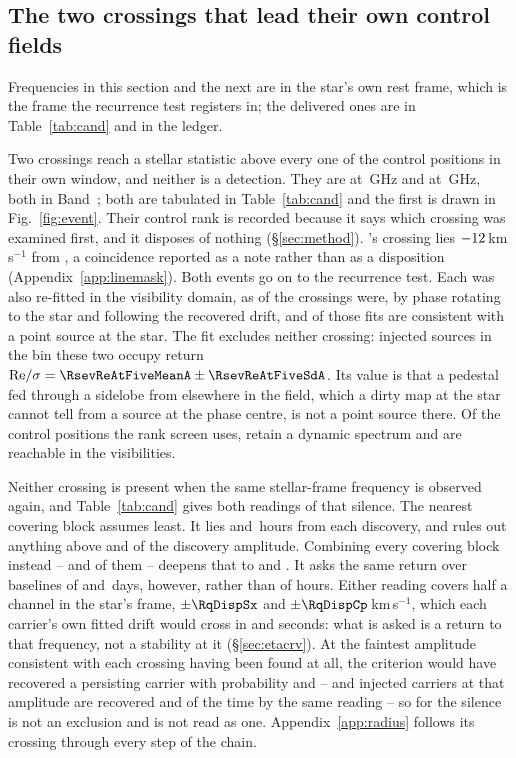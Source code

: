 \subsection{The two crossings that lead their own control fields}
\label{sec:vistest}

Frequencies in this section and the next are in the star's own rest frame,
which is the frame the recurrence test registers in; the delivered ones are in
Table~\ref{tab:cand} and in the ledger.

Two crossings reach a stellar statistic above every one of the \NCtrl{}
control positions in their own window, and neither is a detection. They are
\EvAStar{} at \RqFreqSx\,GHz and \EvBStar{} at \RqFreqCp\,GHz, both in
Band~\EvABand; both are tabulated in Table~\ref{tab:cand} and the first is
drawn in Fig.~\ref{fig:event}. Their control rank is recorded because it says which crossing was examined
first, and it disposes of nothing (\S\ref{sec:method}).
\EvBStar's crossing lies $-12$\,km\,s$^{-1}$ from \EvBLine, a coincidence
reported as a note rather than as a disposition
(Appendix~\ref{app:linemask}). Both events go on to the recurrence test. Each was also re-fitted in the visibility domain, as \LgNFit{} of the
\NCross{} crossings were, by phase rotating to the star and following the
recovered drift, and \LgNLocalCor{} of those fits are consistent with a point
source at the star. The fit excludes neither crossing: injected sources in
the bin these two occupy return
${\rm Re}/\sigma=\RsevReAtFiveMeanA\pm\RsevReAtFiveSdA$. Its value is that a pedestal fed through a sidelobe from elsewhere in
the field, which a dirty map at the star cannot tell from a source at the
phase centre, is not a point source there. Of the \NCtrl{} control positions
the rank screen uses, \RcNRetCtrl{} retain a dynamic spectrum and
\RcNVisCtrl{} are reachable in the visibilities.

Neither crossing is present when the same stellar-frame frequency is observed
again, and Table~\ref{tab:cand} gives both readings of that silence. The nearest covering block assumes least. It lies \RcSxNearH{} and
\EvBDeepH\,hours from each discovery, and rules out anything above
\RqNearFracSx{} and \RqNearFracCp{} of the discovery amplitude. Combining every covering block instead -- \RqNRepSx{} and \RqNRepCp{} of
them -- deepens that to \RcSxFive{} and \RcCpFive. It asks the same return
over baselines of \RqSpanDSx{} and \RqSpanDCp\,days, however, rather than of
hours. Either
reading covers half a channel in the star's frame, $\pm\RqDispSx$ and
$\pm\RqDispCp$\,km\,s$^{-1}$, which each carrier's own fitted drift would
cross in \ZtSxLeaveSec{} and \ZtCpLeaveSec{} seconds: what is asked is a
return to that frequency, not a stability at it (\S\ref{sec:etacrv}). At the faintest amplitude consistent with each crossing
having been found at all, the criterion would have recovered a persisting
carrier with probability \RqPowerTrigSx{} and \RqPowerTrigCp{} -- and
injected carriers at that amplitude are recovered \RjMeasSx{} and
\RjMeasCp{} of the time by the same reading -- so for
\EvBStar{} the silence is not an exclusion and is not read as one.
Appendix~\ref{app:radius} follows its crossing through every step
of the chain.


